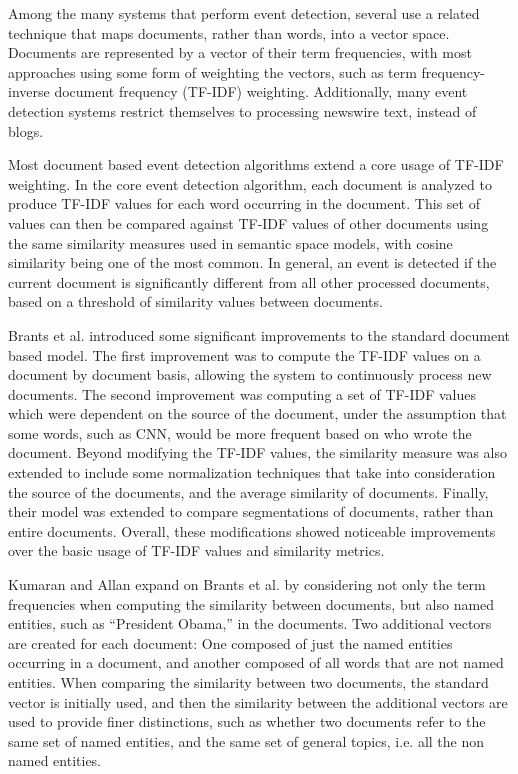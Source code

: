 \documentclass[a4paper,twocolumn,twoside,10pt]{ranlp}
\begin{document}
Among the many systems that perform event detection, several use a related
technique that maps documents, rather than words, into a vector space.
Documents are represented by a vector of their term frequencies, with most
approaches using some form of weighting the vectors, such as term
frequency-inverse document frequency (TF-IDF) weighting.  Additionally, many
event detection systems restrict themselves to processing newswire text, instead
of blogs.

Most document based event detection algorithms extend a core usage of TF-IDF
weighting.  In the core event detection algorithm, each document is analyzed to
produce TF-IDF values for each word occurring in the document.  This set of
values can then be compared against TF-IDF values of other documents using the
same similarity measures used in semantic space models, with cosine similarity
being one of the most common.  In general, an event is detected if the current
document is significantly different from all other processed documents, based on
a threshold of similarity values between
documents\cite{brants03ned,kumaran04entityevent}.

Brants et al. introduced some significant improvements to the standard document
based model\cite{brants03ned}.  The first improvement was to compute the TF-IDF
values on a document by document basis, allowing the system to continuously
process new documents.  The second improvement was computing a set of TF-IDF
values which were dependent on the source of the document, under the assumption
that some words, such as CNN, would be more frequent based on who wrote the
document.  Beyond modifying the TF-IDF values, the similarity measure was also
extended to include some normalization techniques that take into consideration
the source of the documents, and the average similarity of documents.  Finally,
their model was extended to compare segmentations of documents, rather than
entire documents.  Overall, these modifications showed noticeable improvements
over the basic usage of TF-IDF values and similarity metrics.

Kumaran and Allan expand on Brants et al. by considering not only the term
frequencies when computing the similarity between documents, but also named
entities, such as ``President Obama,'' in the
documents\cite{kumaran04entityevent}.  Two additional vectors are created for
each document: One composed of just the named entities occurring in a document,
and another composed of all words that are not named entities.  When comparing
the similarity between two documents, the standard vector is initially used, and
then the similarity between the additional vectors are used to provide finer
distinctions, such as whether two documents refer to the same set of named
entities, and the same set of general topics, i.e. all the non named entities.
\end{document}
